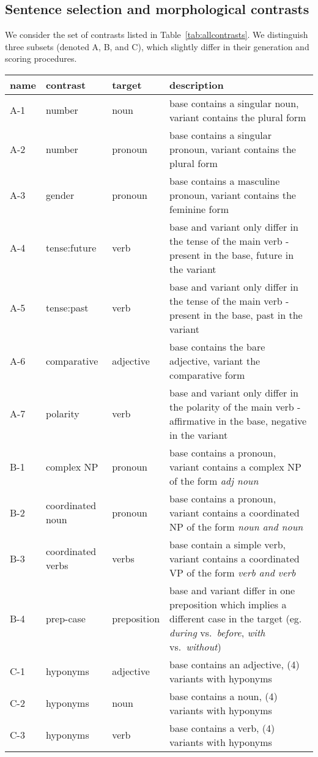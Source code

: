 \documentclass[11pt,letterpaper,final,nohyperref]{article}
\begin{document}
\subsection{Sentence selection and morphological contrasts \label{ssec:selection}}

We consider the set of contrasts listed in Table~\ref{tab:allcontrasts}. We distinguish three subsets (denoted A, B, and C), which slightly differ in their generation and scoring procedures. 
\begin{table*}[t]
  \centering
  \begin{tabular}{lllp{}}
    name & contrast & target & description \\ \hline
    A-1 & number & noun & base contains a singular noun, variant contains the plural form \\
    A-2 & number & pronoun & base contains a singular pronoun, variant contains the plural form \\
    A-3 & gender & pronoun & base contains a masculine pronoun, variant contains the feminine form \\
    A-4 & tense:future & verb & base and variant only differ in the tense of the main verb - present in the base, future in the variant\\
    A-5 & tense:past   & verb & base and variant only differ in the tense of the main verb - present in the base, past in the variant\\
    A-6 & comparative & adjective & base contains the bare adjective, variant the comparative form \\ 
    A-7 & polarity   & verb & base and variant only differ in the polarity of the main verb - affirmative in the base, negative in the variant\\
\hline
    B-1 & complex NP & pronoun & base contains a pronoun, variant contains a complex NP of the form \emph{adj noun} \\
    B-2 & coordinated noun & pronoun & base contains a pronoun, variant contains a coordinated NP of the form \emph{noun and noun} \\ 
    B-3 & coordinated verbs & verbs & base contain a simple verb, variant contains a coordinated VP of the form \emph{verb and verb} \\
    B-4 & prep-case & preposition & base and variant differ in one preposition which implies a different case in the target (eg. \emph{during} vs.\ \emph{before}, \emph{with} vs.\ \emph{without}) \\
\hline
    C-1 & hyponyms & adjective & base contains an adjective, (4) variants with hyponyms \\
    C-2 & hyponyms & noun & base contains a noun, (4) variants with hyponyms \\
    C-3 & hyponyms & verb & base contains a verb, (4) variants with hyponyms \\
  \end{tabular}
  \caption{A set of morphological contrasts. See text for details.}
  \label{tab:allcontrasts}
\end{table*}
\end{document}
